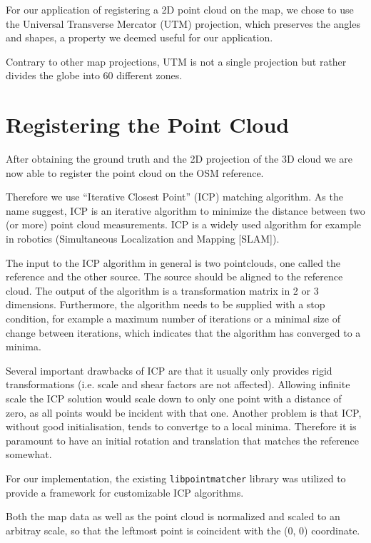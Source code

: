 \documentclass[10pt,twocolumn,letterpaper]{article}
\begin{document}
For our application of registering a 2D point cloud on the map, we chose to use the Universal Transverse Mercator (UTM) projection, which preserves the angles and shapes, a property we deemed useful for our application.

Contrary to other map projections, UTM is not a single projection but rather divides the globe into 60 different zones.

\section{Registering the Point Cloud}

After obtaining the ground truth and the 2D projection of the 3D cloud we are now able to register the point cloud on the OSM reference.

Therefore we use ``Iterative Closest Point'' (ICP) matching algorithm. As the name suggest, ICP is an iterative algorithm to minimize the distance between two (or more) point cloud measurements. ICP is a widely used algorithm for example in robotics (Simultaneous Localization and Mapping [SLAM]). 

The input to the ICP algorithm in general is two pointclouds, one called the reference and the other source. The source should be aligned to the reference cloud. The output of the algorithm is a transformation matrix in 2 or 3 dimensions. Furthermore, the algorithm needs to be supplied with a stop condition, for example a maximum number of iterations or a minimal size of change between iterations, which indicates that the algorithm has converged to a minima.

Several important drawbacks of ICP are that it usually only provides rigid transformations (i.e. scale and shear factors are not affected). Allowing infinite scale the ICP solution would scale down to only one point with a distance of zero, as all points would be incident with that one. Another problem is that ICP, without good initialisation, tends to convertge to a local minima. Therefore it is paramount to have an initial rotation and translation that matches the reference somewhat. %

For our implementation, the existing \texttt{libpointmatcher}\cite{Pomerleau12comp} library was utilized to provide a framework for customizable ICP algorithms.

Both the map data as well as the point cloud is normalized and scaled to an arbitray scale, so that the leftmost point is coincident with the (0, 0) coordinate.
\end{document}
